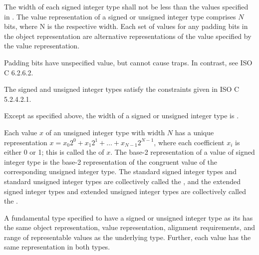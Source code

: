 \pnum
The width of each signed integer type
shall not be less than the values specified in .
The value representation of a signed or unsigned integer type
comprises $N$ bits, where N is the respective width.
Each set of values for any padding bits
in the object representation are
alternative representations of the value specified by the value representation.
\begin{note}
Padding bits have unspecified value, but cannot cause traps.
In contrast, see ISO C 6.2.6.2.
\end{note}
\begin{note}
The signed and unsigned integer types satisfy
the constraints given in ISO C 5.2.4.2.1.
\end{note}
Except as specified above,
the width of a signed or unsigned integer type is
.

\pnum
Each value $x$ of an unsigned integer type with width $N$ has
a unique representation $x = x_0 2^0 + x_1 2^1 + \ldots + x_{N-1} 2^{N-1}$,
where each coefficient $x_i$ is either 0 or 1;
this is called the  of $x$.
The base-2 representation of a value of signed integer type is
the base-2 representation of the congruent value
of the corresponding unsigned integer type.
%
%
The standard signed integer types and standard unsigned integer types
are collectively called the , and the extended
signed integer types and extended
unsigned integer types are collectively called the
.

\pnum
A fundamental type specified to have
a signed or unsigned integer type as its  has
the same object representation,
value representation,
alignment requirements, and
range of representable values as the underlying type.
Further, each value has the same representation in both types.

